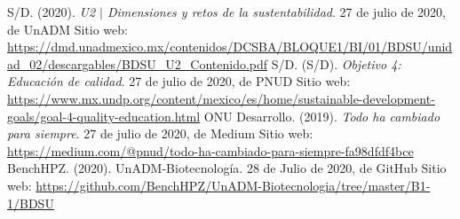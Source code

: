 \documentclass[12pt]{article}
\begin{document}

\begin{thebibliography}{X}
	 S/D. (2020). \textit{U2 $|$ Dimensiones y retos de la sustentabilidad}. 27 de julio de 2020, de UnADM Sitio web: \url{https://dmd.unadmexico.mx/contenidos/DCSBA/BLOQUE1/BI/01/BDSU/unidad_02/descargables/BDSU_U2_Contenido.pdf}
	 S/D. (S/D). \textit{Objetivo 4: Educación de calidad}. 27 de julio de 2020, de PNUD Sitio web: \url{https://www.mx.undp.org/content/mexico/es/home/sustainable-development-goals/goal-4-quality-education.html}
	 ONU Desarrollo. (2019). \textit{Todo ha cambiado para siempre}. 27 de julio de 2020, de Medium Sitio web: \url{https://medium.com/@pnud/todo-ha-cambiado-para-siempre-fa98dfdf4bce}
	 BenchHPZ. (2020). UnADM-Biotecnología. 28 de Julio de 2020, de GitHub Sitio web: \url{https://github.com/BenchHPZ/UnADM-Biotecnologia/tree/master/B1-1/BDSU}


\end{thebibliography}
\end{document}
